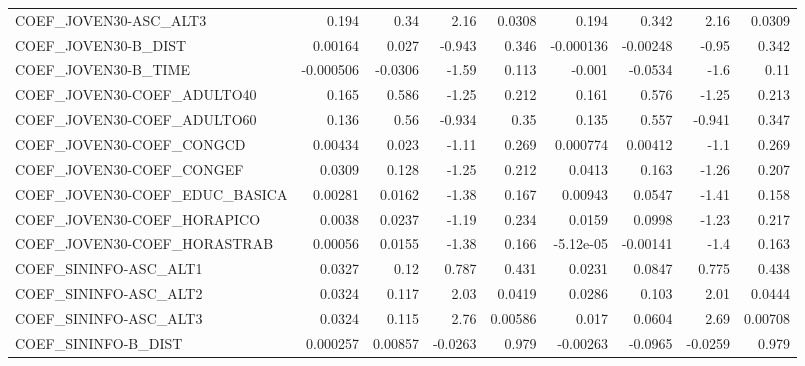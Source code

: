 \begin{tabular}{lrrrrrrrr}
COEF\_JOVEN30-ASC\_ALT3             &       0.194 &         0.34 &    2.16 &   0.0308 &      0.194 &       0.342 &         2.16 &        0.0309 \\
COEF\_JOVEN30-B\_DIST               &     0.00164 &        0.027 &  -0.943 &    0.346 &  -0.000136 &    -0.00248 &        -0.95 &         0.342 \\
COEF\_JOVEN30-B\_TIME               &   -0.000506 &      -0.0306 &   -1.59 &    0.113 &     -0.001 &     -0.0534 &         -1.6 &          0.11 \\
COEF\_JOVEN30-COEF\_ADULTO40        &       0.165 &        0.586 &   -1.25 &    0.212 &      0.161 &       0.576 &        -1.25 &         0.213 \\
COEF\_JOVEN30-COEF\_ADULTO60        &       0.136 &         0.56 &  -0.934 &     0.35 &      0.135 &       0.557 &       -0.941 &         0.347 \\
COEF\_JOVEN30-COEF\_CONGCD          &     0.00434 &        0.023 &   -1.11 &    0.269 &   0.000774 &     0.00412 &         -1.1 &         0.269 \\
COEF\_JOVEN30-COEF\_CONGEF          &      0.0309 &        0.128 &   -1.25 &    0.212 &     0.0413 &       0.163 &        -1.26 &         0.207 \\
COEF\_JOVEN30-COEF\_EDUC\_BASICA     &     0.00281 &       0.0162 &   -1.38 &    0.167 &    0.00943 &      0.0547 &        -1.41 &         0.158 \\
COEF\_JOVEN30-COEF\_HORAPICO        &      0.0038 &       0.0237 &   -1.19 &    0.234 &     0.0159 &      0.0998 &        -1.23 &         0.217 \\
COEF\_JOVEN30-COEF\_HORASTRAB       &     0.00056 &       0.0155 &   -1.38 &    0.166 &  -5.12e-05 &    -0.00141 &         -1.4 &         0.163 \\
COEF\_SININFO-ASC\_ALT1             &      0.0327 &         0.12 &   0.787 &    0.431 &     0.0231 &      0.0847 &        0.775 &         0.438 \\
COEF\_SININFO-ASC\_ALT2             &      0.0324 &        0.117 &    2.03 &   0.0419 &     0.0286 &       0.103 &         2.01 &        0.0444 \\
COEF\_SININFO-ASC\_ALT3             &      0.0324 &        0.115 &    2.76 &  0.00586 &      0.017 &      0.0604 &         2.69 &       0.00708 \\
COEF\_SININFO-B\_DIST               &    0.000257 &      0.00857 & -0.0263 &    0.979 &   -0.00263 &     -0.0965 &      -0.0259 &         0.979 \\

\end{tabular}
